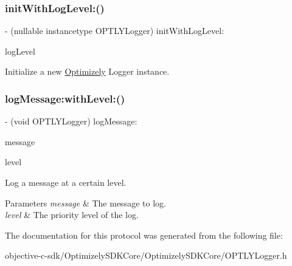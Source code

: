 \subsubsection{\texorpdfstring{init\+With\+Log\+Level\+:()}{initWithLogLevel:()}}
{\footnotesize\ttfamily -\/ (nullable instancetype O\+P\+T\+L\+Y\+Logger) init\+With\+Log\+Level\+: \begin{DoxyParamCaption}\item[{(Optimizely\+Log\+Level)}]{log\+Level }\end{DoxyParamCaption}}

Initialize a new \mbox{\hyperlink{interface_optimizely}{Optimizely}} Logger instance. \mbox{\label{protocol_o_p_t_l_y_logger_01-p_ada43d041642cbaab84a54b8b7d7d7681}} 
\subsubsection{\texorpdfstring{log\+Message\+:with\+Level\+:()}{logMessage:withLevel:()}}
{\footnotesize\ttfamily -\/ (void O\+P\+T\+L\+Y\+Logger) log\+Message\+: \begin{DoxyParamCaption}\item[{(nonnull N\+S\+String $\ast$)}]{message }\item[{withLevel:(Optimizely\+Log\+Level)}]{level }\end{DoxyParamCaption}}

Log a message at a certain level. 
\begin{DoxyParams}{Parameters}
{\em message} & The message to log. \\
\hline
{\em level} & The priority level of the log. \\
\hline
\end{DoxyParams}


The documentation for this protocol was generated from the following file\+:\begin{DoxyCompactItemize}
\item 
objective-\/c-\/sdk/\+Optimizely\+S\+D\+K\+Core/\+Optimizely\+S\+D\+K\+Core/O\+P\+T\+L\+Y\+Logger.\+h\end{DoxyCompactItemize}
